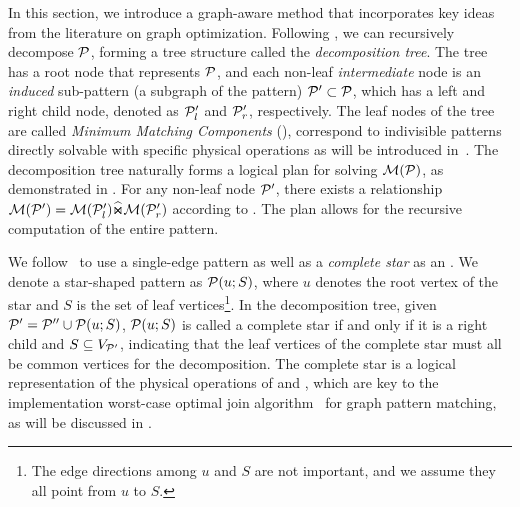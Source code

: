 In this section, we introduce a graph-aware method that incorporates key ideas from the literature on graph optimization. Following , we can recursively decompose $\mathcal{P}$, forming a tree structure called the \emph{decomposition tree}. The tree has a root node that represents $\mathcal{P}$, and each non-leaf \emph{intermediate} node is an \emph{induced} sub-pattern (a subgraph of the pattern) $\mathcal{P}' \subset \mathcal{P}$, which has a left and right child node, denoted as $\mathcal{P}'_l$ and $\mathcal{P}'_r$, respectively. %
The leaf nodes of the tree are called \emph{Minimum Matching Components} (\mmc), correspond to indivisible patterns directly solvable with specific physical operations
as will be introduced in~. The decomposition tree naturally forms a logical plan for solving $\mathcal{M}(\mathcal{P})$, as demonstrated in . For any non-leaf node $\mathcal{P}'$, there exists a relationship $\mathcal{M}(\mathcal{P}') = \mathcal{M}(\mathcal{P}'_l) \widehat{\Join} \mathcal{M}(\mathcal{P}'_r)$ according to . The plan allows for the recursive computation of the entire pattern.

We follow~\cite{huge} to use a single-edge pattern as well as a \emph{complete star} as an \mmc. We denote a star-shaped pattern as $\mathcal{P}(u;S)$, where $u$ denotes the root vertex of the star and $S$ is the set of leaf vertices\footnote{The edge directions among $u$ and $S$ are not important, and we assume they  all point from $u$ to $S$.}.
In the decomposition tree, given $\mathcal{P}' = \mathcal{P}'' \cup \mathcal{P}(u;S)$, $\mathcal{P}(u;S)$ is called a complete star if and only if it is a right child and $S \subseteq V_{\mathcal{P}'}$, indicating that the leaf vertices of the complete star must all be common vertices for the decomposition. The complete star is a logical representation of the physical operations of \expand and \intersect, which are key to the implementation worst-case optimal join algorithm~\cite{mhedhbi2019optimizing} for graph pattern matching, as will be discussed in .


